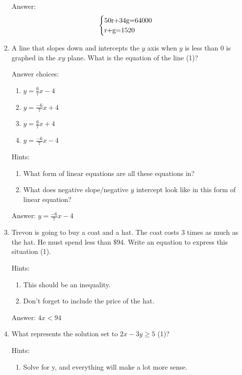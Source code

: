 \documentclass{article}
\begin{document}
\begin{enumerate}
{	      Answer:
	      \[
		      \begin{array}{l}
			      \begin{cases}
				      $50r+34g=64000$ & \\
				      $r+g=1520$
			      \end{cases}
		      \end{array}\]
	      }
	\item {A line that slopes down and intercepts the $y$ axis when $y$ is less than $0$ is graphed in the $xy$ plane. What is the equation of the line (1)?

	      Answer choices:
	      \begin{enumerate}
		      \item{\(y=\frac{6}{7}x-4\)}
		      \item{\(y=\frac{-6}{7}x+4\)}
		      \item{\(y=\frac{6}{7}x+4\)}
		      \item{\(y=\frac{-6}{7}x-4\)}
	      \end{enumerate}

	      Hints:
	      \begin{enumerate}
		      \item{What form of linear equations are all these equations in?}
		      \item {What does negative slope/negative $y$ intercept look like in this form of linear equation?}
	      \end{enumerate}

	      Answer: \(y=\frac{-6}{7}x-4\)}
	\item {Trevon is going to buy a coat and a hat. The coat costs $3$ times as much as the hat. He must spend less than $\$94$. Write an equation to express this situation (1).

	      Hints:
	      \begin{enumerate}
		      \item {This should be an inequality.}
		      \item {Don't forget to include the price of the hat.}
	      \end{enumerate}

	      Answer: \(4x < 94\)}
	\item {What represents the solution set to \(2x - 3y\geq5\) (1)?

	      Hints:
	      \begin{enumerate}
		      \item {Solve for y, and everything will make a lot more sense.}
	      \end{enumerate}

}
\end{enumerate}
\end{document}
